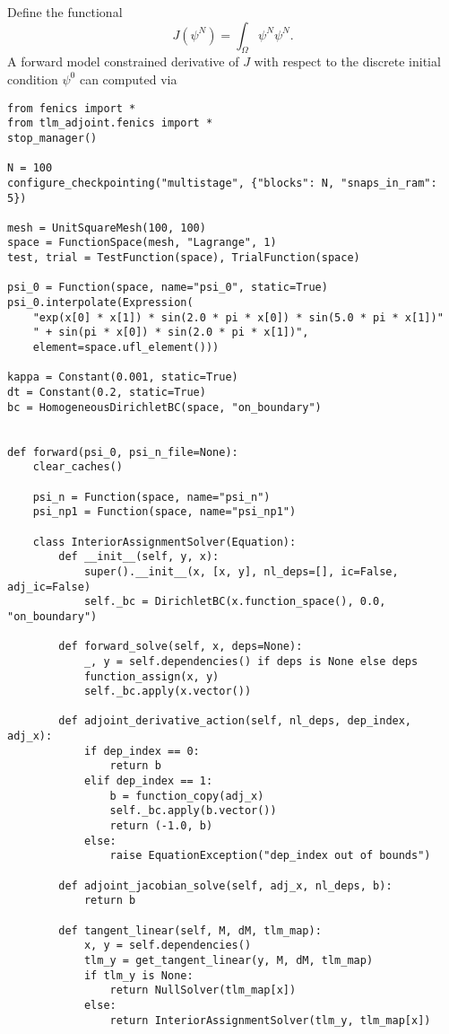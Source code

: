 \documentclass[11pt]{article}
\begin{document}
Define the functional
\begin{equation*}
  J \left( \psi^N \right) = \int_\Omega \psi^N \psi^N.
\end{equation*}
A forward model constrained derivative of $J$ with respect to the discrete
initial condition $\psi^0$ can computed via
\begin{lstlisting}
from fenics import *
from tlm_adjoint.fenics import *
stop_manager()

N = 100
configure_checkpointing("multistage", {"blocks": N, "snaps_in_ram": 5})

mesh = UnitSquareMesh(100, 100)
space = FunctionSpace(mesh, "Lagrange", 1)
test, trial = TestFunction(space), TrialFunction(space)

psi_0 = Function(space, name="psi_0", static=True)
psi_0.interpolate(Expression(
    "exp(x[0] * x[1]) * sin(2.0 * pi * x[0]) * sin(5.0 * pi * x[1])"
    " + sin(pi * x[0]) * sin(2.0 * pi * x[1])",
    element=space.ufl_element()))

kappa = Constant(0.001, static=True)
dt = Constant(0.2, static=True)
bc = HomogeneousDirichletBC(space, "on_boundary")


def forward(psi_0, psi_n_file=None):
    clear_caches()

    psi_n = Function(space, name="psi_n")
    psi_np1 = Function(space, name="psi_np1")

    class InteriorAssignmentSolver(Equation):
        def __init__(self, y, x):
            super().__init__(x, [x, y], nl_deps=[], ic=False, adj_ic=False)
            self._bc = DirichletBC(x.function_space(), 0.0, "on_boundary")

        def forward_solve(self, x, deps=None):
            _, y = self.dependencies() if deps is None else deps
            function_assign(x, y)
            self._bc.apply(x.vector())

        def adjoint_derivative_action(self, nl_deps, dep_index, adj_x):
            if dep_index == 0:
                return b
            elif dep_index == 1:
                b = function_copy(adj_x)
                self._bc.apply(b.vector())
                return (-1.0, b)
            else:
                raise EquationException("dep_index out of bounds")

        def adjoint_jacobian_solve(self, adj_x, nl_deps, b):
            return b

        def tangent_linear(self, M, dM, tlm_map):
            x, y = self.dependencies()
            tlm_y = get_tangent_linear(y, M, dM, tlm_map)
            if tlm_y is None:
                return NullSolver(tlm_map[x])
            else:
                return InteriorAssignmentSolver(tlm_y, tlm_map[x])


\end{lstlisting}
\end{document}
